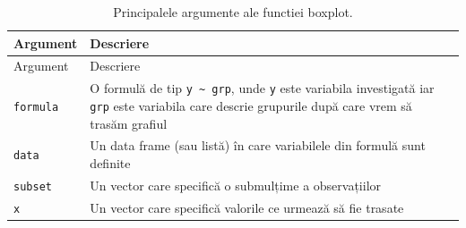 \documentclass[]{article}
\begin{document}
\begin{longtable}[]{@{}ll@{}}
\caption{Principalele argumente ale functiei boxplot.}\tabularnewline
\toprule
\begin{minipage}[b]{0.18\columnwidth}\raggedright\strut
Argument\strut
\end{minipage} & \begin{minipage}[b]{0.67\columnwidth}\raggedright\strut
Descriere\strut
\end{minipage}\tabularnewline
\midrule
\endfirsthead
\toprule
\begin{minipage}[b]{0.18\columnwidth}\raggedright\strut
Argument\strut
\end{minipage} & \begin{minipage}[b]{0.67\columnwidth}\raggedright\strut
Descriere\strut
\end{minipage}\tabularnewline
\midrule
\endhead
\begin{minipage}[t]{0.18\columnwidth}\raggedright\strut
\texttt{formula}\strut
\end{minipage} & \begin{minipage}[t]{0.67\columnwidth}\raggedright\strut
O formulă de tip \texttt{y\ \textasciitilde{}\ grp}, unde \texttt{y}
este variabila investigată iar \texttt{grp} este variabila care descrie
grupurile după care vrem să trasăm grafiul\strut
\end{minipage}\tabularnewline
\begin{minipage}[t]{0.18\columnwidth}\raggedright\strut
\texttt{data}\strut
\end{minipage} & \begin{minipage}[t]{0.67\columnwidth}\raggedright\strut
Un data frame (sau listă) în care variabilele din formulă sunt
definite\strut
\end{minipage}\tabularnewline
\begin{minipage}[t]{0.18\columnwidth}\raggedright\strut
\texttt{subset}\strut
\end{minipage} & \begin{minipage}[t]{0.67\columnwidth}\raggedright\strut
Un vector care specifică o submulțime a observațiilor\strut
\end{minipage}\tabularnewline
\begin{minipage}[t]{0.18\columnwidth}\raggedright\strut
\texttt{x}\strut
\end{minipage} & \begin{minipage}[t]{0.67\columnwidth}\raggedright\strut
Un vector care specifică valorile ce urmează să fie trasate\strut
\end{minipage}\tabularnewline

\end{longtable}
\end{document}
